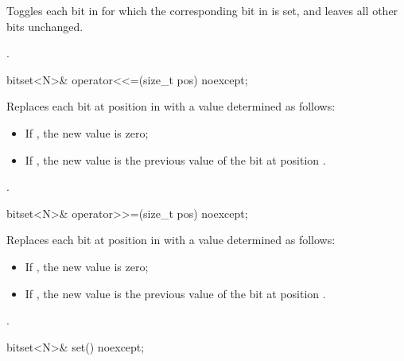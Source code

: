 \begin{itemdescr}
\pnum
\effects
Toggles each bit in
for which the corresponding bit in  is set, and leaves all other bits unchanged.

\pnum
\returns
{}.
\end{itemdescr}

%
\begin{itemdecl}
bitset<N>& operator<<=(size_t pos) noexcept;
\end{itemdecl}

\begin{itemdescr}
\pnum
\effects
Replaces each bit at position  in
with a value determined as follows:

\begin{itemize}
\item
If , the new value is zero;
\item
If , the new value is the previous
value of the bit at position .
\end{itemize}

\pnum
\returns
{}.
\end{itemdescr}

%
\begin{itemdecl}
bitset<N>& operator>>=(size_t pos) noexcept;
\end{itemdecl}

\begin{itemdescr}
\pnum
\effects
Replaces each bit at position  in
with a value determined as follows:

\begin{itemize}
\item
If , the new value is zero;
\item
If , the new value is the previous value of the bit at position .
\end{itemize}

\pnum
\returns
{}.
\end{itemdescr}

\begin{itemdecl}
bitset<N>& set() noexcept;
\end{itemdecl}

